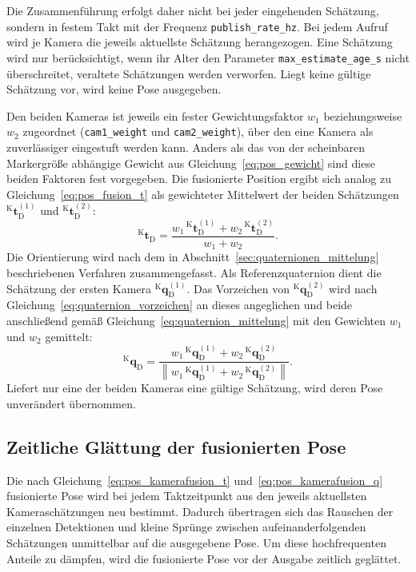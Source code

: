 Die Zusammenführung erfolgt daher nicht bei jeder eingehenden Schätzung, sondern in festem Takt mit der Frequenz \texttt{publish\_rate\_hz}.
Bei jedem Aufruf wird je Kamera die jeweils aktuellste Schätzung herangezogen.
Eine Schätzung wird nur berücksichtigt, wenn ihr Alter den Parameter \texttt{max\_estimate\_age\_s} nicht überschreitet, veraltete Schätzungen werden verworfen.
Liegt keine gültige Schätzung vor, wird keine Pose ausgegeben.

Den beiden Kameras ist jeweils ein fester Gewichtungsfaktor $w_1$ beziehungsweise $w_2$ zugeordnet (\texttt{cam1\_weight} und \texttt{cam2\_weight}), über den eine Kamera als zuverlässiger eingestuft werden kann.
Anders als das von der scheinbaren Markergröße abhängige Gewicht aus Gleichung~\ref{eq:pos_gewicht} sind diese beiden Faktoren fest vorgegeben.
Die fusionierte Position ergibt sich analog zu Gleichung~\ref{eq:pos_fusion_t} als gewichteter Mittelwert der beiden Schätzungen $^{\mathrm{K}}\mathbf{t}_{\mathrm{D}}^{(1)}$ und $^{\mathrm{K}}\mathbf{t}_{\mathrm{D}}^{(2)}$:
\begin{equation}
^{\mathrm{K}}\mathbf{t}_{\mathrm{D}} = \frac{w_1\,{^{\mathrm{K}}\mathbf{t}_{\mathrm{D}}^{(1)}} + w_2\,{^{\mathrm{K}}\mathbf{t}_{\mathrm{D}}^{(2)}}}{w_1 + w_2}.
\label{eq:pos_kamerafusion_t}
\end{equation}
Die Orientierung wird nach dem in Abschnitt~\ref{sec:quaternionen_mittelung} beschriebenen Verfahren zusammengefasst.
Als Referenzquaternion dient die Schätzung der ersten Kamera $^{\mathrm{K}}\mathbf{q}_{\mathrm{D}}^{(1)}$.
Das Vorzeichen von $^{\mathrm{K}}\mathbf{q}_{\mathrm{D}}^{(2)}$ wird nach Gleichung~\ref{eq:quaternion_vorzeichen} an 
dieses angeglichen und beide anschließend gemäß Gleichung~\ref{eq:quaternion_mittelung} mit den Gewichten $w_1$ und $w_2$ gemittelt:
\begin{equation}
^{\mathrm{K}}\mathbf{q}_{\mathrm{D}} = \frac{w_1\,{^{\mathrm{K}}\mathbf{q}_{\mathrm{D}}^{(1)}} + w_2\,{^{\mathrm{K}}\mathbf{q}_{\mathrm{D}}^{(2)}}}{\left\lVert w_1\,{^{\mathrm{K}}\mathbf{q}_{\mathrm{D}}^{(1)}} + w_2\,{^{\mathrm{K}}\mathbf{q}_{\mathrm{D}}^{(2)}} \right\rVert}.
\label{eq:pos_kamerafusion_q}
\end{equation}
Liefert nur eine der beiden Kameras eine gültige Schätzung, wird deren Pose unverändert übernommen.


\subsection*{Zeitliche Glättung der fusionierten Pose}
\label{subsec:pos_glaettung}
Die nach Gleichung~\ref{eq:pos_kamerafusion_t} und~\ref{eq:pos_kamerafusion_q} fusionierte Pose wird bei jedem 
Taktzeitpunkt aus den jeweils aktuellsten Kameraschätzungen neu bestimmt.
Dadurch übertragen sich das Rauschen der einzelnen Detektionen und kleine Sprünge zwischen aufeinanderfolgenden Schätzungen unmittelbar auf die ausgegebene Pose.
Um diese hochfrequenten Anteile zu dämpfen, wird die fusionierte Pose vor der Ausgabe zeitlich geglättet.

